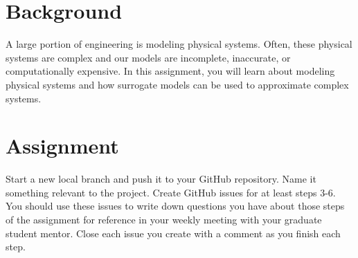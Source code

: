 \documentclass[12pt]{article}
\begin{document}
	


\section{Background}
A large portion of engineering is modeling physical systems. 
Often, these physical systems are complex and our models are incomplete, inaccurate, or computationally expensive.
In this assignment, you will learn about modeling physical systems and how surrogate models can be used to approximate complex systems.



\section{Assignment}

Start a new local branch and push it to your GitHub repository. Name it something relevant to the project. Create GitHub issues for at least steps 3-6. You should use these issues to write down questions you have about those steps of the assignment for reference in your weekly meeting with your graduate student mentor. Close each issue you create with a comment as you finish each step.
\end{document}

